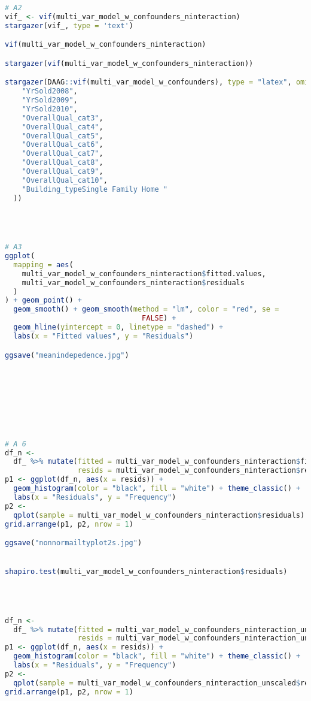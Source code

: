 \documentclass[a4paper]{article}
\begin{document}
\begin{lstlisting}[language=R]
# A2
vif_ <- vif(multi_var_model_w_confounders_ninteraction)
stargazer(vif_, type = 'text')

vif(multi_var_model_w_confounders_ninteraction)

stargazer(vif(multi_var_model_w_confounders_ninteraction))

stargazer(DAAG::vif(multi_var_model_w_confounders), type = "latex", omit = c(
    "YrSold2008",
    "YrSold2009",
    "YrSold2010",
    "OverallQual_cat3",
    "OverallQual_cat4",
    "OverallQual_cat5",
    "OverallQual_cat6",
    "OverallQual_cat7",
    "OverallQual_cat8",
    "OverallQual_cat9",
    "OverallQual_cat10",
    "Building_typeSingle Family Home "
  ))




# A3
ggplot(
  mapping = aes(
    multi_var_model_w_confounders_ninteraction$fitted.values,
    multi_var_model_w_confounders_ninteraction$residuals
  )
) + geom_point() +
  geom_smooth() + geom_smooth(method = "lm", color = "red", se =
                                FALSE) +
  geom_hline(yintercept = 0, linetype = "dashed") +
  labs(x = "Fitted values", y = "Residuals")

ggsave("meanindepedence.jpg")








# A 6
df_n <-
  df_ %>% mutate(fitted = multi_var_model_w_confounders_ninteraction$fitted.values,
                 resids = multi_var_model_w_confounders_ninteraction$residuals)
p1 <- ggplot(df_n, aes(x = resids)) +
  geom_histogram(color = "black", fill = "white") + theme_classic() +
  labs(x = "Residuals", y = "Frequency")
p2 <-
  qplot(sample = multi_var_model_w_confounders_ninteraction$residuals) + theme_classic()
grid.arrange(p1, p2, nrow = 1)

ggsave("nonnormailtyplot2s.jpg")


shapiro.test(multi_var_model_w_confounders_ninteraction$residuals)




df_n <-
  df_ %>% mutate(fitted = multi_var_model_w_confounders_ninteraction_unscaled$fitted.values,
                 resids = multi_var_model_w_confounders_ninteraction_unscaled$residuals)
p1 <- ggplot(df_n, aes(x = resids)) +
  geom_histogram(color = "black", fill = "white") + theme_classic() +
  labs(x = "Residuals", y = "Frequency")
p2 <-
  qplot(sample = multi_var_model_w_confounders_ninteraction_unscaled$residuals) + theme_classic()
grid.arrange(p1, p2, nrow = 1)


\end{lstlisting}
\end{document}
